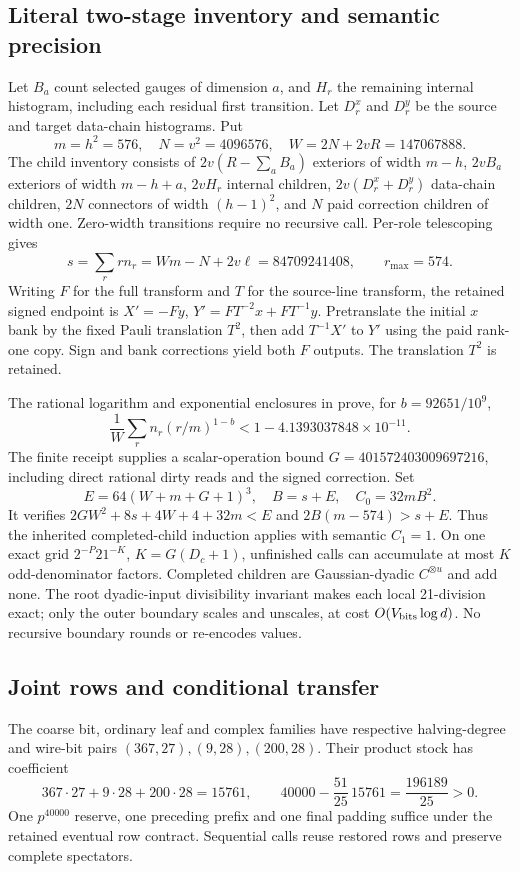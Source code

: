 \subsection{Literal two-stage inventory and semantic precision}
Let $B_a$ count selected gauges of dimension $a$, and $H_r$ the remaining
internal histogram, including each residual first transition. Let $D_r^x$
and $D_r^y$ be the source and target data-chain histograms. Put
\[
 m=h^2=576,\quad N=v^2=4096576,\quad
 W=2N+2vR=147067888.
\]
The child inventory consists of $2v(R-\sum_aB_a)$ exteriors of width
$m-h$, $2vB_a$ exteriors of width $m-h+a$, $2vH_r$ internal children,
$2v(D_r^x+D_r^y)$ data-chain children, $2N$ connectors of width
$(h-1)^2$, and $N$ paid correction children of width one. Zero-width
transitions require no recursive call. Per-role telescoping gives
\[
 s=\sum_r rn_r=Wm-N+2v\ell=84709241408,
 \qquad r_{\max}=574.
\]
Writing $F$ for the full transform and $T$ for the source-line transform,
the retained signed endpoint is
$X'=-Fy$, $Y'=FT^{-2}x+FT^{-1}y$.
Pretranslate the initial $x$ bank by the fixed Pauli translation $T^2$,
then add $T^{-1}X'$ to $Y'$ using the paid rank-one copy. Sign and bank
corrections yield both $F$ outputs. The translation $T^2$ is retained.

The rational logarithm and exponential enclosures in
 prove, for $b=92651/10^9$,
\[
 \frac1W\sum_r n_r(r/m)^{1-b}
 <1-4.1393037848\times10^{-11}.
\]
The finite receipt supplies a scalar-operation bound
$G=401572403009697216$, including direct rational dirty reads and the
signed correction. Set
\[
 E=64(W+m+G+1)^3,\quad B=s+E,\quad C_0=32mB^2.
\]
It verifies $2GW^2+8s+4W+4+32m<E$ and
$2B(m-574)>s+E$. Thus the inherited completed-child induction applies
with semantic $C_1=1$. On one exact grid $2^{-P}21^{-K}$,
$K=G(D_c+1)$, unfinished calls can accumulate at most $K$ odd-denominator
factors. Completed children are Gaussian-dyadic $C^{\otimes u}$ and add
none. The root dyadic-input divisibility invariant makes each local
21-division exact; only the outer boundary scales and unscales, at cost
$O(V_{\rm bits}\log d)$. No recursive boundary rounds or re-encodes values.

\subsection{Joint rows and conditional transfer}
The coarse bit, ordinary leaf and complex families have respective
halving-degree and wire-bit pairs $(367,27),(9,28),(200,28)$.
Their product stock has coefficient
\[
 367\cdot27+9\cdot28+200\cdot28=15761,
 \qquad40000-\frac{51}{25}\,15761=\frac{196189}{25}>0.
\]
One $p^{40000}$ reserve, one preceding prefix and one final padding suffice
under the retained eventual row contract. Sequential calls reuse restored
rows and preserve complete spectators.

